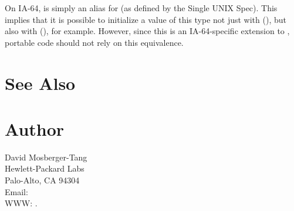 \documentclass{article}
\begin{document}
On IA-64,  is simply an alias for
 (as defined by the Single UNIX Spec).  This implies
that it is possible to initialize a value of this type not just with
(), but also with (), for
example.  However, since this is an IA-64-specific extension to
, portable code should not rely on this equivalence.


\section{See Also}


\section{Author}

\noindent
David Mosberger-Tang\\
Hewlett-Packard Labs\\
Palo-Alto, CA 94304\\
Email: \\
WWW: .
\LatexManEnd
\end{document}
